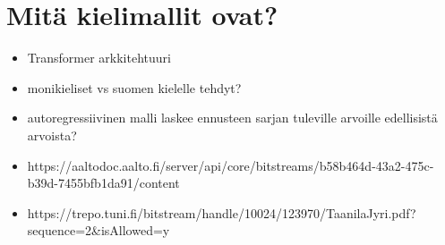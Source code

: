 \chapter{Mitä kielimallit ovat?}%
\label{ch:teoria}

\begin{itemize}
  \item Transformer arkkitehtuuri
  \item monikieliset vs suomen kielelle tehdyt?
  \item autoregressiivinen malli laskee ennusteen sarjan tuleville arvoille edellisistä arvoista?
  \item https://aaltodoc.aalto.fi/server/api/core/bitstreams/b58b464d-43a2-475c-b39d-7455bfb1da91/content
  \item https://trepo.tuni.fi/bitstream/handle/10024/123970/TaanilaJyri.pdf?sequence=2\&isAllowed=y
\end{itemize}
